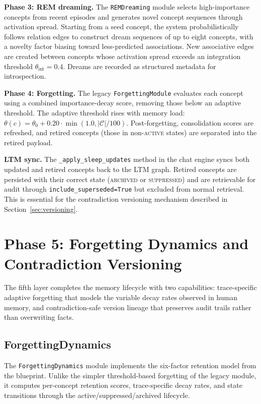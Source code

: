 \documentclass[11pt,twocolumn]{article}
\begin{document}
\textbf{Phase 3: REM dreaming.} The \texttt{REMDreaming} module selects high-importance concepts from recent episodes and generates novel concept sequences through activation spread. Starting from a seed concept, the system probabilistically follows relation edges to construct dream sequences of up to eight concepts, with a novelty factor biasing toward less-predicted associations. New associative edges are created between concepts whose activation spread exceeds an integration threshold $\theta_{\text{int}} = 0.4$. Dreams are recorded as structured metadata for introspection.

\textbf{Phase 4: Forgetting.} The legacy \texttt{ForgettingModule} evaluates each concept using a combined importance-decay score, removing those below an adaptive threshold. The adaptive threshold rises with memory load: $\theta(c) = \theta_0 + 0.20 \cdot \min(1.0, |\mathcal{C}| / 100)$. Post-forgetting, consolidation scores are refreshed, and retired concepts (those in non-\textsc{active} states) are separated into the retired payload.

\textbf{LTM sync.} The \texttt{\_apply\_sleep\_updates} method in the chat engine syncs both updated and retired concepts back to the LTM graph. Retired concepts are persisted with their correct state (\textsc{archived} or \textsc{suppressed}) and are retrievable for audit through \texttt{include\_superseded=True} but excluded from normal retrieval. This is essential for the contradiction versioning mechanism described in Section~\ref{sec:versioning}.

\section{Phase 5: Forgetting Dynamics and Contradiction Versioning}
\label{sec:forgetting}

The fifth layer completes the memory lifecycle with two capabilities: trace-specific adaptive forgetting that models the variable decay rates observed in human memory, and contradiction-safe version lineage that preserves audit trails rather than overwriting facts.

\subsection{ForgettingDynamics}

The \texttt{ForgettingDynamics} module implements the six-factor retention model from the blueprint. Unlike the simpler threshold-based forgetting of the legacy module, it computes per-concept retention scores, trace-specific decay rates, and state transitions through the active/suppressed/archived lifecycle.
\end{document}
